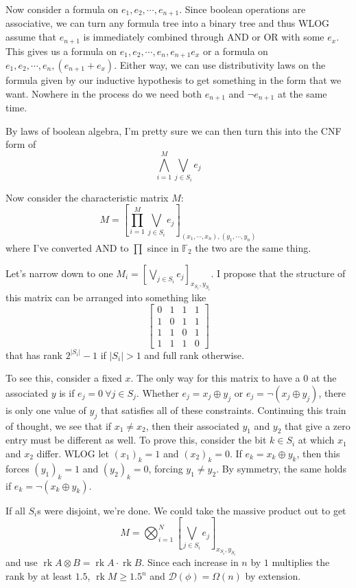 \documentclass[12pt]{article}
\DeclareMathOperator{\rk}{rk}
\begin{document}
Now consider a formula on $e_1, e_2, \cdots, e_{n+1}$.
Since boolean operations are associative, we can turn any formula tree into
a binary tree and thus WLOG assume that $e_{n+1}$ is immediately combined
through AND or OR with some $e_x$.
This gives us a formula on $e_1, e_2, \cdots, e_n, e_{n+1}e_x$ or a formula
on $e_1, e_2, \cdots, e_n, (e_{n+1}+e_x)$.
Either way, we can use distributivity laws on the formula given
by our inductive hypothesis to get something in the form that we want.
Nowhere in the process do we need both $e_{n+1}$ and $\lnot e_{n+1}$ at the same time.

By laws of boolean algebra, I'm pretty sure we can then turn this into the CNF form of
\[\bigwedge_{i=1}^{M} \bigvee_{j \in S_i} e_j\]

Now consider the characteristic matrix $M$:
\[M = \left[\prod_{i=1}^{M} \bigvee_{j \in S_i} e_j\right]_{(x_1, \cdots, x_n),(y_1, \cdots, y_n)}\]
where I've converted AND to $\prod$ since in $\mathbb{F}_2$ the two are the same thing.

Let's narrow down to one $M_i=\left[\bigvee_{j \in S_i} e_j\right]_{x_{S_i}, y_{S_i}}$.
I propose that the structure of this matrix can be arranged into something like
\[\begin{bmatrix}
        0 & 1 & 1 & 1 \\
        1 & 0 & 1 & 1 \\
        1 & 1 & 0 & 1 \\
        1 & 1 & 1 & 0
    \end{bmatrix}\]
that has rank $2^{|S_i|}-1$ if $|S_i| > 1$ and full rank otherwise.

To see this, consider a fixed $x$.
The only way for this matrix to have a $0$ at the associated $y$ is if $e_j=0\ \forall j \in S_j$.
Whether $e_j=x_j \oplus y_j$ or $e_j=\lnot (x_j \oplus y_j)$, there is only
one value of $y_j$ that satisfies all of these constraints.
Continuing this train of thought, we see that if $x_1 \ne x_2$, then their
associated $y_1$ and $y_2$ that give a zero entry must be different as well.
To prove this, consider the bit $k \in S_i$ at which $x_1$ and $x_2$ differ.
WLOG let $(x_1)_k = 1$ and $(x_2)_k=0$.
If $e_k=x_k \oplus y_k$, then this forces $(y_1)_k=1$ and $(y_2)_k=0$, forcing $y_1 \ne y_2$.
By symmetry, the same holds if $e_k=\lnot (x_k \oplus y_k)$.

If all $S_i$s were disjoint, we're done.
We could take the massive product out to get
\[M = \bigotimes_{i=1}^{N} \left[\bigvee_{j \in S_i} e_j\right]_{x_{S_i}, y_{S_i}}\]
and use $\rk A \otimes B = \rk A \cdot \rk B$.
Since each increase in $n$ by $1$ multiplies the rank by at least $1.5$,
$\rk M \ge 1.5^n$ and $\mathcal{D}(\phi) = \Omega(n)$ by extension.
\end{document}
